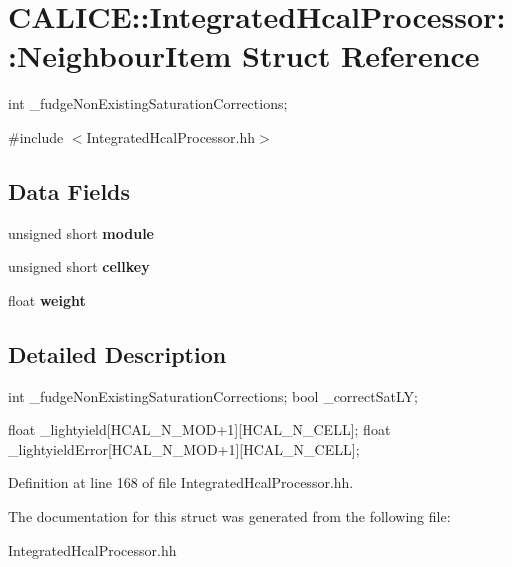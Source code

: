 \section{CALICE::IntegratedHcalProcessor::NeighbourItem Struct Reference}
\label{structCALICE_1_1IntegratedHcalProcessor_1_1NeighbourItem}


int \_\-fudgeNonExistingSaturationCorrections;  


{\ttfamily \#include $<$IntegratedHcalProcessor.hh$>$}\subsection*{Data Fields}
\begin{DoxyCompactItemize}
\item 
unsigned short {\bfseries module}\label{structCALICE_1_1IntegratedHcalProcessor_1_1NeighbourItem_a222785cbd28eaf736340eef25e436e20}

\item 
unsigned short {\bfseries cellkey}\label{structCALICE_1_1IntegratedHcalProcessor_1_1NeighbourItem_a145ab8e4188b4e065424e61b1281dbdb}

\item 
float {\bfseries weight}\label{structCALICE_1_1IntegratedHcalProcessor_1_1NeighbourItem_a9c688d0bbc8c74d9a8403c0d8f12f0f6}

\end{DoxyCompactItemize}


\subsection{Detailed Description}
int \_\-fudgeNonExistingSaturationCorrections; bool \_\-correctSatLY;

float \_\-lightyield[HCAL\_\-N\_\-MOD+1][HCAL\_\-N\_\-CELL]; float \_\-lightyieldError[HCAL\_\-N\_\-MOD+1][HCAL\_\-N\_\-CELL]; 

Definition at line 168 of file IntegratedHcalProcessor.hh.

The documentation for this struct was generated from the following file:\begin{DoxyCompactItemize}
\item 
IntegratedHcalProcessor.hh\end{DoxyCompactItemize}
